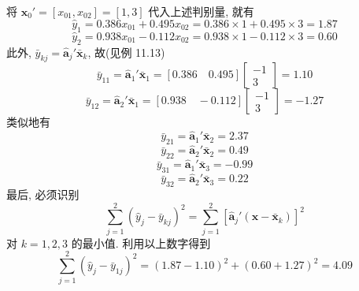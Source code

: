 将 $\mathbf{x}_0'=[x_{01},x_{02}]=[1,3]$ 代入上述判别量, 就有
\[
\hat{y}_1=0.386x_{01}+0.495x_{02}=0.386\times 1+0.495\times 3=1.87
\]
\[
\hat{y}_2=0.938x_{01}-0.112x_{02}=0.938\times 1-0.112\times 3=0.60
\]
此外, $\bar{y}_{kj}=\hat{\mathbf{a}}_j'\bar{\mathbf{x}}_k$, 故(见例 11.13)
\[
\bar{y}_{11}=\hat{\mathbf{a}}_1'\bar{\mathbf{x}}_1=[0.386\quad 0.495]\begin{bmatrix}-1\\3\end{bmatrix}=1.10
\]
\[
\bar{y}_{12}=\hat{\mathbf{a}}_2'\bar{\mathbf{x}}_1=[0.938\quad -0.112]\begin{bmatrix}-1\\3\end{bmatrix}=-1.27
\]
类似地有
\[
\bar{y}_{21}=\hat{\mathbf{a}}_1'\bar{\mathbf{x}}_2=2.37
\]
\[
\bar{y}_{22}=\hat{\mathbf{a}}_2'\bar{\mathbf{x}}_2=0.49
\]
\[
\bar{y}_{31}=\hat{\mathbf{a}}_1'\bar{\mathbf{x}}_3=-0.99
\]
\[
\bar{y}_{32}=\hat{\mathbf{a}}_2'\bar{\mathbf{x}}_3=0.22
\]
最后, 必须识别
\[
\sum_{j=1}^{2}(\hat{y}_j-\bar{y}_{kj})^2=\sum_{j=1}^{2}[\hat{\mathbf{a}}_j'(\mathbf{x}-\bar{\mathbf{x}}_k)]^2
\]
对 $k=1,2,3$ 的最小值. 利用以上数字得到
\[
\sum_{j=1}^{2}(\hat{y}_j-\bar{y}_{1j})^2=(1.87-1.10)^2+(0.60+1.27)^2=4.09
\]
